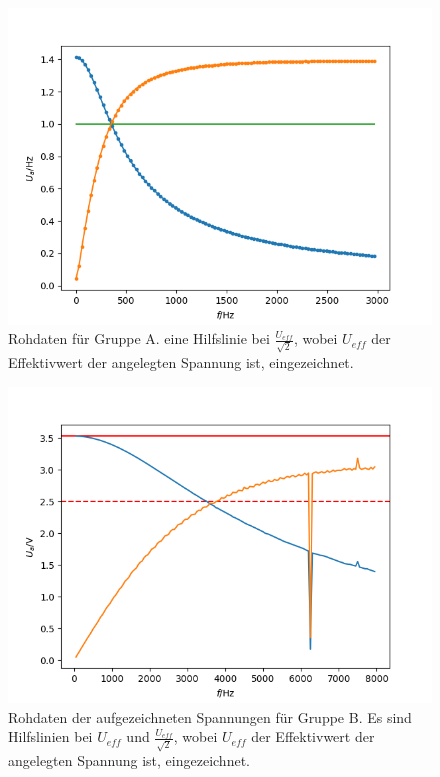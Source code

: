 \documentclass[12pt,a4paper]{article}
\begin{document}
\begin{figure}
\centering
\includegraphics[scale=1.0]{Bilder/RohdatenHochTief_A.png}
\caption{Rohdaten für Gruppe A. eine Hilfslinie bei $\frac{U_{eff}}{\sqrt{2}}$, wobei $U_{eff}$ der Effektivwert der angelegten Spannung ist, eingezeichnet.}
\label{fig:RohdatenHochTief_A}
\end{figure}

\begin{figure}
\centering
\includegraphics[scale=1.0]{Bilder/RohdatenHochTief_B.png}
\caption{Rohdaten der aufgezeichneten Spannungen für Gruppe B. Es sind Hilfslinien bei $U_{eff}$ und $\frac{U_{eff}}{\sqrt{2}}$, wobei $U_{eff}$ der Effektivwert der angelegten Spannung ist, eingezeichnet.}
\label{fig:RohdatenHochTief_B}
\end{figure}
\end{document}

